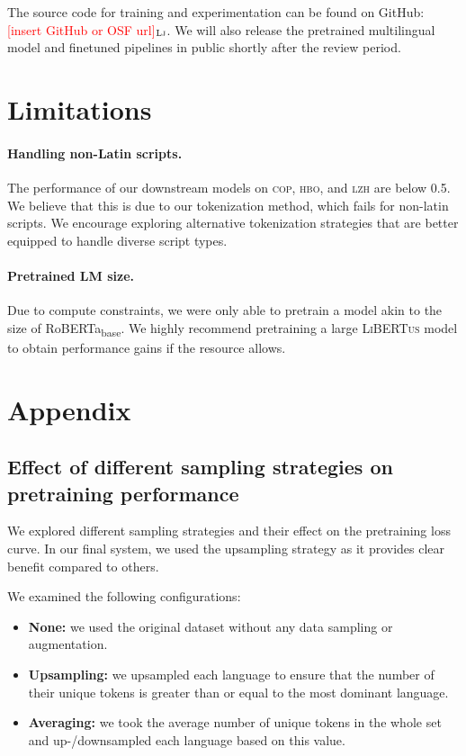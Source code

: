 \documentclass[11pt]{article}
\newcommand{\draftonly}[1]{#1}
\newcommand{\draftcomment}[3]{\draftonly{\textcolor{#2}{[#3]{$_{\textsc{#1}}$}}}}
\newcommand{\lj}[1]{\draftcomment{Lj}{red}{#1}}
\newcommand{\libertus}{\textsc{LiBERTus}}
\begin{document}
The source code for training and experimentation can be found on GitHub: \lj{insert GitHub or OSF url}.
We will also release the pretrained multilingual model and finetuned pipelines in public shortly after the review period.

\section*{Limitations}

\paragraph{Handling non-Latin scripts.}
The performance of our downstream models on \textsc{cop}, \textsc{hbo}, and \textsc{lzh} are below 0.5.
We believe that this is due to our tokenization method, which fails for non-latin scripts.
We encourage exploring alternative tokenization strategies that are better equipped to handle diverse script types.

\paragraph{Pretrained LM size.}
Due to compute constraints, we were only able to pretrain a model akin to the size of RoBERTa\textsubscript{base}.
We highly recommend pretraining a large \libertus{} model to obtain performance gains if the resource allows.




\appendix

\section{Appendix}
\label{sec:appendix}

\subsection{Effect of different sampling strategies on pretraining performance}

We explored different sampling strategies and their effect on the pretraining loss curve.
In our final system, we used the upsampling strategy as it provides clear benefit compared to others.

We examined the following configurations:
\begin{itemize}
  \item \textbf{None:} we used the original dataset without any data sampling or augmentation.
  \item \textbf{Upsampling:} we upsampled each language to ensure that the number of their unique tokens is greater than or equal to the most dominant language.
  \item \textbf{Averaging:} we took the average number of unique tokens in the whole set and up-/downsampled each language based on this value.
\end{itemize}
\end{document}
